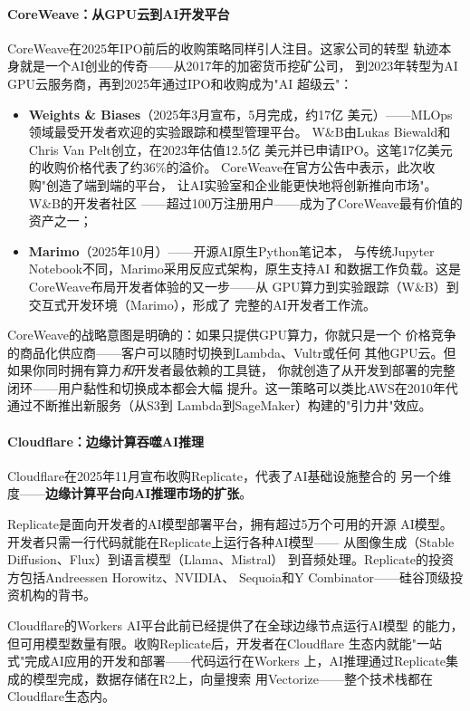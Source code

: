\paragraph{CoreWeave：从GPU云到AI开发平台}
CoreWeave在2025年IPO前后的收购策略同样引人注目。这家公司的转型
轨迹本身就是一个AI创业的传奇——从2017年的加密货币挖矿公司，
到2023年转型为AI GPU云服务商，再到2025年通过IPO和收购成为"AI
超级云"：

\begin{itemize}
  \item \textbf{Weights \& Biases}（2025年3月宣布，5月完成，约17亿
    美元）——MLOps领域最受开发者欢迎的实验跟踪和模型管理平台。
    W\&B由Lukas Biewald和Chris Van Pelt创立，在2023年估值12.5亿
    美元并已申请IPO。这笔17亿美元的收购价格代表了约36\%的溢价。
    CoreWeave在官方公告中表示，此次收购"创造了端到端的平台，
    让AI实验室和企业能更快地将创新推向市场"。W\&B的开发者社区
    ——超过100万注册用户——成为了CoreWeave最有价值的资产之一；
  \item \textbf{Marimo}（2025年10月）——开源AI原生Python笔记本，
    与传统Jupyter Notebook不同，Marimo采用反应式架构，原生支持AI
    和数据工作负载。这是CoreWeave布局开发者体验的又一步——从
    GPU算力到实验跟踪（W\&B）到交互式开发环境（Marimo），形成了
    完整的AI开发者工作流。
\end{itemize}

CoreWeave的战略意图是明确的：如果只提供GPU算力，你就只是一个
价格竞争的商品化供应商——客户可以随时切换到Lambda、Vultr或任何
其他GPU云。但如果你同时拥有算力\emph{和}开发者最依赖的工具链，
你就创造了从开发到部署的完整闭环——用户黏性和切换成本都会大幅
提升。这一策略可以类比AWS在2010年代通过不断推出新服务（从S3到
Lambda到SageMaker）构建的"引力井"效应。

\paragraph{Cloudflare：边缘计算吞噬AI推理}

Cloudflare在2025年11月宣布收购Replicate，代表了AI基础设施整合的
另一个维度——\textbf{边缘计算平台向AI推理市场的扩张}。

Replicate是面向开发者的AI模型部署平台，拥有超过5万个可用的开源
AI模型。开发者只需一行代码就能在Replicate上运行各种AI模型——
从图像生成（Stable Diffusion、Flux）到语言模型（Llama、Mistral）
到音频处理。Replicate的投资方包括Andreessen Horowitz、NVIDIA、
Sequoia和Y Combinator——硅谷顶级投资机构的背书。

Cloudflare的Workers AI平台此前已经提供了在全球边缘节点运行AI模型
的能力，但可用模型数量有限。收购Replicate后，开发者在Cloudflare
生态内就能"一站式"完成AI应用的开发和部署——代码运行在Workers
上，AI推理通过Replicate集成的模型完成，数据存储在R2上，向量搜索
用Vectorize——整个技术栈都在Cloudflare生态内。


